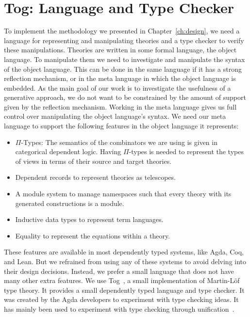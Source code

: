 \chapter{Tog: Language and Type Checker}
\label{ch:tog}

To implement the methodology we presented in Chapter~\ref{ch:design}, we need a language for representing and manipulating theories and a type checker to verify these manipulations. 
Theories are written in some formal language, the object language. To manipulate them we need to investigate and manipulate the syntax of the object language. This can be done in the same language if it has a strong reflection mechanism, or in the meta language in which the object language is embedded. As the main goal of our work is to investigate the usefulness of a generative approach, we do not want to be constrained by the amount of support given by the reflection mechanism. Working in the meta language gives us full control over manipulating the object language's syntax. 
We need our meta language to support the following features in the object language it represents:
\begin{itemize}
\item $\Pi$-Types: The semantics of the combinators we are using is given in categorical dependent logic. Having $\Pi$-types is needed to represent the types of views in terms of their source and target theories. 
\item Dependent records to represent theories as telescopes. 
\item A module system to manage namespaces such that every theory with its generated constructions is a module. 
\item Inductive data types to represent term languages. 
\item Equality to represent the equations within a theory. 
\end{itemize}

These features are available in most dependently typed systems, like Agda, Coq, and Lean. But we refrained from using any of these systems to avoid delving into their design decisions. Instead, we prefer a small language that does not have many other extra features. We use Tog~\cite{tog}, a small implementation of Martin-L\"{o}f type theory. 
It provides a small dependently typed language and type checker. It was created by the Agda developers to experiment with type checking ideas. It has mainly been used to experiment with type checking through unification~\cite{mazzoli2016type}. 

